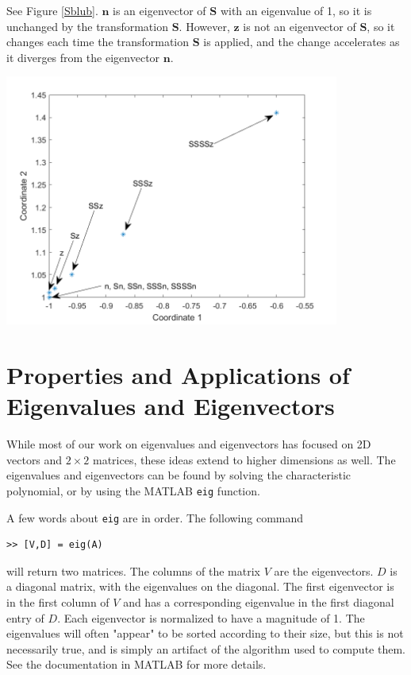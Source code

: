 \begin{sol}
See Figure \ref{Sblub}. $\mathbf{n}$ is an eigenvector of $\mathbf{S}$ with an eigenvalue of 1, so it is unchanged by the transformation $\mathbf{S}$. However, $\mathbf{z}$ is not an eigenvector of $\mathbf{S}$, so it changes each time the transformation $\mathbf{S}$ is applied, and the change accelerates as it diverges from the eigenvector $\mathbf{n}$.

\begin{center}
\includegraphics[width=11cm]{FacesNight5/figs/SSSSz.png}
\label{Sblub}
\end{center}
\end{sol}

\section{Properties and Applications of Eigenvalues and Eigenvectors}
While most of our work on eigenvalues and eigenvectors has focused on 2D vectors and $2\times 2$ matrices, these ideas extend to higher dimensions as well. The eigenvalues and eigenvectors can be found by solving the characteristic polynomial, or by using the MATLAB \texttt{eig} function.

A few words about \texttt{eig} are in order. The following command
\begin{verbatim}
>> [V,D] = eig(A)
\end{verbatim}
will return two matrices. The columns of the matrix $V$ are the eigenvectors. $D$ is a diagonal matrix, with the eigenvalues on the diagonal. The first eigenvector is in the first column of $V$ and has a corresponding eigenvalue in the first diagonal entry of $D$. Each eigenvector is normalized to have a magnitude of 1. The eigenvalues will often "appear" to be sorted according to their size, but this is not necessarily true, and is simply an artifact of the algorithm used to compute them. See the documentation in MATLAB for more details.

